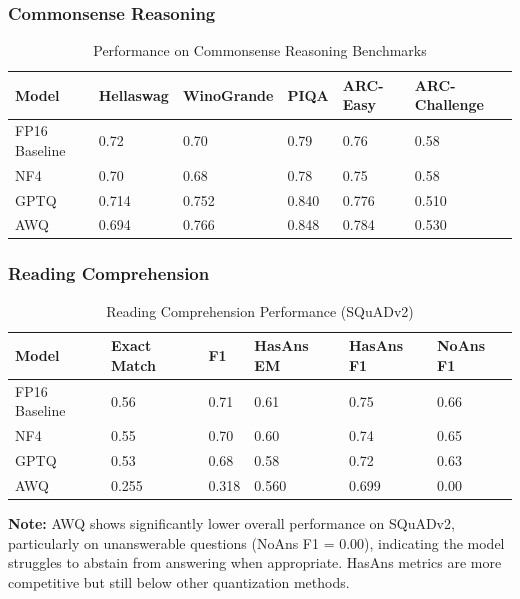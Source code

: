 \documentclass[11pt,a4paper]{article}
\begin{document}
\subsubsection{Commonsense Reasoning}

\begin{table}[H]
\centering
\caption{Performance on Commonsense Reasoning Benchmarks}
\begin{tabularx}{\textwidth}{@{}X C{1.7cm} C{2cm} C{1.5cm} C{1.8cm} C{2.2cm}@{}}
\toprule
\textbf{Model} & \textbf{Hellaswag} & \textbf{WinoGrande} & \textbf{PIQA} & \textbf{ARC-Easy} & \textbf{ARC-Challenge} \\
\midrule
FP16 Baseline & 0.72 & 0.70 & 0.79 & 0.76 & 0.58 \\
NF4 & 0.70 & 0.68 & 0.78 & 0.75 & 0.58 \\
GPTQ & 0.714 & 0.752 & 0.840 & 0.776 & 0.510 \\
AWQ & 0.694 & 0.766 & 0.848 & 0.784 & 0.530 \\
\bottomrule
\end{tabularx}
\label{tab:commonsense_reasoning}
\end{table}

\subsubsection{Reading Comprehension}

\begin{table}[H]
\centering
\caption{Reading Comprehension Performance (SQuADv2)}
\begin{tabularx}{\textwidth}{@{}X C{2.2cm} C{2.2cm} C{2.2cm} C{2.2cm} C{2.2cm}@{}}
\toprule
\textbf{Model} & \textbf{Exact Match} & \textbf{F1} & \textbf{HasAns EM} & \textbf{HasAns F1} & \textbf{NoAns F1} \\
\midrule
FP16 Baseline & 0.56 & 0.71 & 0.61 & 0.75 & 0.66 \\
NF4 & 0.55 & 0.70 & 0.60 & 0.74 & 0.65 \\
GPTQ & 0.53 & 0.68 & 0.58 & 0.72 & 0.63 \\
AWQ & 0.255 & 0.318 & 0.560 & 0.699 & 0.00 \\
\bottomrule
\end{tabularx}
\label{tab:reading_comprehension}
\end{table}

\textbf{Note:} AWQ shows significantly lower overall performance on SQuADv2, particularly on unanswerable questions (NoAns F1 = 0.00), indicating the model struggles to abstain from answering when appropriate. HasAns metrics are more competitive but still below other quantization methods.
\end{document}
